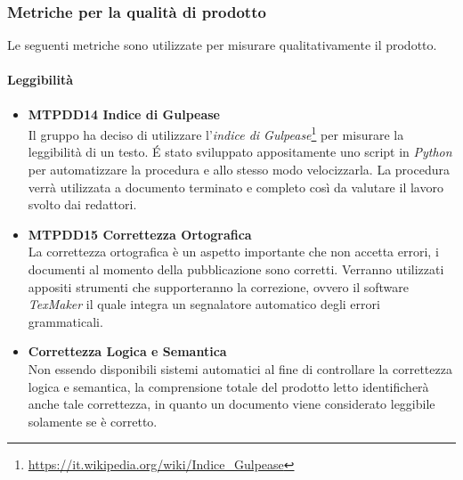 \iffalse 
\paragraph{MTTS14 Difetti trovati per requisito}\-\\
Indice numerico che rappresenta il numero medio di test eseguiti per requisito. Utile per verificare che il sistema soddisfi i requisiti a pieno. La misurazione avviene:
\begin{center}
	\item $MDR = \frac{TDR}{TR}$
\end{center}
dove MDR è la media calcolata, TDR il numero totale di difetti trovati e TR il numero totale di requisiti.
\fi

\subsubsection{Metriche per la qualità di prodotto}
Le seguenti metriche sono utilizzate per misurare qualitativamente il prodotto.

\iffalse
\paragraph{MTTS15 Numero di test eseguiti per requisito}\-\\
\fi

\paragraph{Leggibilità}
\begin{itemize}
	\item \textbf{MTPDD14 Indice di Gulpease}\-\\
Il gruppo ha deciso di utilizzare l'\textit{indice di Gulpease}\glossario\footnote{\url{https://it.wikipedia.org/wiki/Indice\_Gulpease}} per misurare la leggibilità di un testo. \'E stato sviluppato appositamente uno script in \textit{Python} per automatizzare la procedura e allo stesso modo velocizzarla. La procedura verrà utilizzata a documento terminato e completo così da valutare il lavoro svolto dai redattori.

	\item \textbf{MTPDD15 Correttezza Ortografica}\-\\
La correttezza ortografica è un aspetto importante che non accetta errori, i documenti al momento della pubblicazione sono corretti. Verranno utilizzati appositi strumenti che supporteranno la correzione, ovvero il software \textit{TexMaker} il quale integra un segnalatore automatico degli errori grammaticali. 

	\item \textbf{Correttezza Logica e Semantica} \-\\
Non essendo disponibili sistemi automatici al fine di controllare la correttezza logica e semantica, la comprensione totale del prodotto letto identificherà anche tale correttezza, in quanto un documento viene considerato leggibile solamente se è corretto.
\end{itemize}

